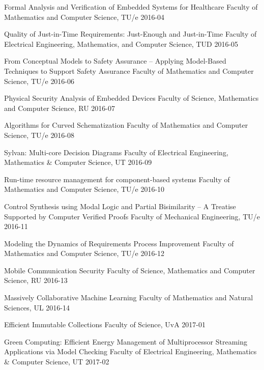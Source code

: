\begin{multicols}{2}
         {Formal Analysis and Verification of Embedded Systems for Healthcare}
         {Faculty of Mathematics and Computer Science, TU/e}
         {2016-04}

         {Quality of Just-in-Time Requirements: Just-Enough and Just-in-Time}
         {Faculty of Electrical Engineering, Mathematics, and Computer Science, TUD}
         {2016-05}

         {From Conceptual Models to Safety Assurance -- Applying Model-Based Techniques to Support Safety Assurance}
         {Faculty of Mathematics and Computer Science, TU/e}
         {2016-06}

         {Physical Security Analysis of Embedded Devices}
         {Faculty of Science, Mathematics and Computer Science, RU}
         {2016-07}

         {Algorithms for Curved Schematization}
         {Faculty of Mathematics and Computer Science, TU/e}
         {2016-08}

         {Sylvan: Multi-core Decision Diagrams}
         {Faculty of Electrical Engineering, Mathematics \& Computer Science, UT}
         {2016-09}

         {Run-time resource management for component-based systems}
         {Faculty of Mathematics and Computer Science, TU/e}
         {2016-10}

         {Control Synthesis using Modal Logic and Partial Bisimilarity -- A Treatise Supported by Computer Verified Proofs}
         {Faculty of Mechanical Engineering, TU/e}
         {2016-11}

         {Modeling the Dynamics of Requirements Process Improvement}
         {Faculty of Mathematics and Computer Science, TU/e}
         {2016-12}

         {Mobile Communication Security}
         {Faculty of Science, Mathematics and Computer Science, RU}
         {2016-13}

         {Massively Collaborative Machine Learning}
         {Faculty of Mathematics and Natural Sciences, UL}
         {2016-14}

         {Efficient Immutable Collections}
         {Faculty of Science, UvA}
         {2017-01}

         {Green Computing: Efficient Energy Management of Multiprocessor Streaming Applications via Model Checking}
         {Faculty of Electrical Engineering, Mathematics \& Computer Science, UT}
         {2017-02}


\end{multicols}
